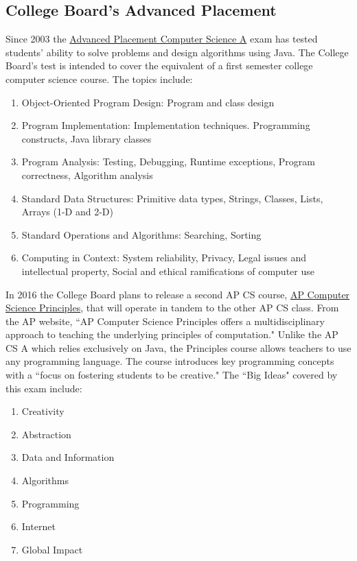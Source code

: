 \subsection{College Board's Advanced Placement}
Since 2003 the \href{http://media.collegeboard.com/digitalServices/pdf/ap/ap-course-overviews/ap-computer-science-a-course-overview.pdf}{Advanced Placement Computer Science A} exam has tested students' ability to solve problems and design algorithms using Java. The College Board's test is intended to cover the equivalent of a first semester college computer science course. The topics include:
\begin{enumerate}
	\item Object-Oriented Program Design:  Program and class design 
	\item Program Implementation: Implementation techniques. Programming constructs, Java library classes
	\item Program Analysis: Testing, Debugging, Runtime exceptions, Program correctness, Algorithm analysis
	\item Standard Data Structures:  Primitive data types, Strings, Classes, Lists, Arrays (1-D and 2-D) 
	\item Standard Operations and Algorithms: Searching, Sorting
	\item Computing in Context: System reliability, Privacy, Legal issues and intellectual property, Social and ethical ramifications of computer use 
\end{enumerate}
In 2016 the College Board plans to release a second AP CS course, \href{https://secure-media.collegeboard.org/digitalServices/pdf/ap/ap-computer-science-principles-curriculum-framework.pdf}{AP Computer Science Principles}, that will operate in tandem to the other AP CS class. From the AP website, ``AP Computer Science Principles offers a multidisciplinary approach to teaching the underlying principles of computation." Unlike the AP CS A which relies exclusively on Java, the Principles course allows teachers to use any programming language. The course introduces key programming concepts with a ``focus on fostering students to be creative." The ``Big Ideas" covered by this exam include:
\begin{enumerate}
	\item Creativity
	\item Abstraction
	\item Data and Information
	\item Algorithms
	\item Programming
	\item Internet
	\item Global Impact
\end{enumerate} \par
